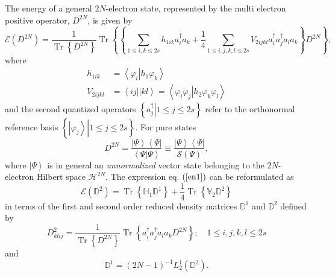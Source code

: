 \documentclass[titlepage]{article}%
\begin{document}
The energy of a general $2N$-electron state, represented by the multi electron
positive operator, $D^{2N}$, is given by
\begin{equation}
\mathcal{E}\left(  D^{2N}\right)  =\frac{1}{\operatorname{Tr}\left\{
D^{2N}\right\}  }\operatorname{Tr}\left\{  \left\{  \sum_{1\leq i,k\leq
2s}h_{1ik}a_{i}^{\dagger}a_{k}+\frac{1}{4}\sum_{1\leq i,j,k,l\leq2s}%
V_{2ijkl}a_{i}^{\dagger}a_{j}^{\dagger}a_{l}a_{k}\right\}  D^{2N}\right\}  ,
\label{en1}%
\end{equation}
where
\begin{align}
h_{1ik}  &  =\left\langle \varphi_{i}\left\vert h_{1}\varphi_{k}\right.
\right\rangle \nonumber\\
V_{2ijkl}  &  =\left\langle ij||kl\right\rangle =\left\langle \varphi
_{i}\varphi_{j}\left\vert h_{2}\varphi_{k}\varphi_{l}\right.  \right\rangle
\end{align}
and the second quantized operators $\left\{  \left.  a_{j}^{\dagger
}\right\vert 1\leq j\leq2s\right\}  $ refer to the orthonormal reference basis
$\left\{  \left.  \left\vert \varphi_{j}\right\rangle \right\vert 1\leq
j\leq2s\right\}  $. For pure states
\begin{equation}
D^{2N}=\frac{\left\vert \Psi\right\rangle \left\langle \Psi\right\vert
}{\left\langle \Psi\left\vert \Psi\right.  \right\rangle }\equiv
\frac{\left\vert \Psi\right\rangle \left\langle \Psi\right\vert }%
{\mathcal{S}\left(  \Psi\right)  },
\end{equation}
where $\left\vert \Psi\right\rangle $ is in general an \emph{unnormalized
}vector\emph{ }state belonging to the $2N$-electron Hilbert space
$\mathcal{H}^{2N}.$ The expression eq. $\left(  \ref{en1}\right)  $ can be
reformulated as
\begin{equation}
\mathcal{E}\left(  \mathbb{D}^{2}\right)  =\operatorname{Tr}\left\{
\mathbb{H}_{1}\mathbb{D}^{1}\right\}  +\frac{1}{4}\operatorname{Tr}\left\{
\mathbb{V}_{2}\mathbb{D}^{2}\right\}
\end{equation}
in terms of the first and second order reduced density matrices $\mathbb{D}%
^{1}$ and $\mathbb{D}^{2}$ defined by
\begin{equation}
D_{klij}^{2}=\frac{1}{\operatorname{Tr}\left\{  D^{2N}\right\}  }%
\operatorname{Tr}\left\{  a_{i}^{\dagger}a_{j}^{\dagger}a_{l}a_{k}%
D^{2N}\right\}  ;\quad1\leq i,j,k,l\leq2s
\end{equation}
and
\begin{equation}
\mathbb{D}^{1}=\left(  2N-1\right)  ^{-1}L_{2}^{1}\left(  \mathbb{D}%
^{2}\right)  .
\end{equation}
\end{document}
